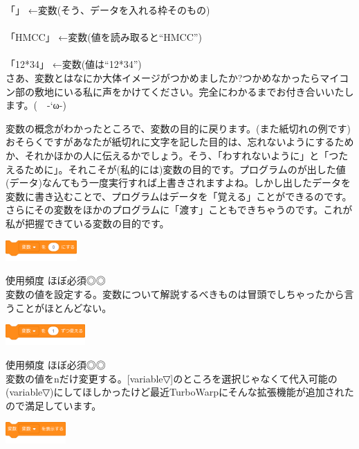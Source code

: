 \documentclass[b5paper,10pt]{jsarticle}
\begin{document}
\begin{multicols*}{3}
「」 ←変数(そう、データを入れる枠そのもの)\\
\\
「HMCC」 ←変数(値を読み取ると``HMCC'')\\
\\
「12*34」 ←変数(値は``12*34'')\\

さあ、変数とはなにか大体イメージがつかめましたか?つかめなかったらマイコン部の敷地にいる私に声をかけてください。完全にわかるまでお付き合いいたします。(　-`ω-)

変数の概念がわかったところで、変数の目的に戻ります。(また紙切れの例です)おそらくですがあなたが紙切れに文字を記した目的は、忘れないようにするためか、それかほかの人に伝えるかでしょう。そう、「わすれないように」と「つたえるために」。それこそが(私的には)変数の目的です。プログラムのが出した値(データ)なんてもう一度実行すれば上書きされますよね。しかし出したデータを変数に書き込むことで、プログラムはデータを「覚える」ことができるのです。さらにその変数をほかのプログラムに「渡す」こともできちゃうのです。これが私が把握できている変数の目的です。
\begin{itembox}{1}
\includegraphics[height=8mm]{images/variables_1.png}
\end{itembox}
使用頻度 ほぼ必須◎◎\\
変数の値を設定する。変数について解説するべきものは冒頭でしちゃったから言うことがほとんどない。
\begin{itembox}{2}
\includegraphics[height=8mm]{images/variables_2.png}
\end{itembox}
使用頻度 ほぼ必須◎◎\\
変数の値をnだけ変更する。[variable▽]のところを選択じゃなくて代入可能の(variable▽)にしてほしかったけど最近TurboWarpにそんな拡張機能が追加されたので満足しています。
\begin{itembox}{3}
\includegraphics[height=8mm]{images/variables_3.png}


\end{itembox}
\end{multicols*}
\end{document}
